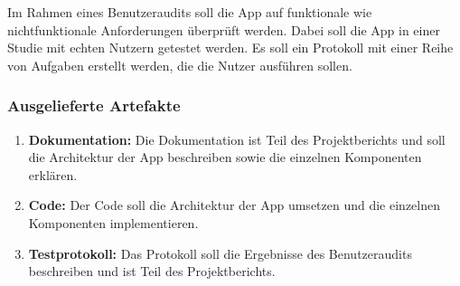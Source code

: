Im Rahmen eines Benutzeraudits soll die App auf funktionale wie nichtfunktionale Anforderungen überprüft werden.
Dabei soll die App in einer Studie mit echten Nutzern getestet werden.
Es soll ein Protokoll mit einer Reihe von Aufgaben erstellt werden, die die Nutzer ausführen sollen.

\subsubsection{Ausgelieferte Artefakte}

\begin{enumerate}
	\item \textbf{Dokumentation:} Die Dokumentation ist Teil des Projektberichts und soll die Architektur der App beschreiben sowie die einzelnen Komponenten erklären.
	\item \textbf{Code:} Der Code soll die Architektur der App umsetzen und die einzelnen Komponenten implementieren.
	\item \textbf{Testprotokoll:} Das Protokoll soll die Ergebnisse des Benutzeraudits beschreiben und ist Teil des Projektberichts.
\end{enumerate}